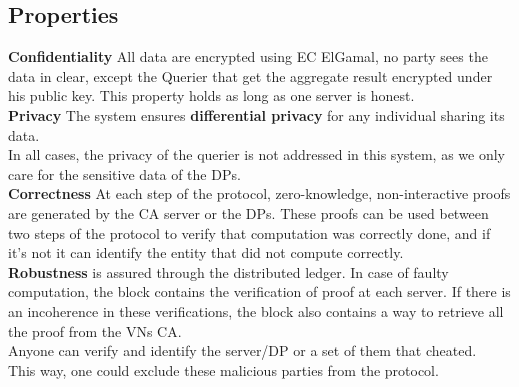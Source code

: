 \documentclass{article}
\begin{document}
\subsection{Properties}
\textbf{Confidentiality} All data are encrypted using EC ElGamal, no party sees the data in clear, except the Querier that get the aggregate result encrypted under his public key. This property holds as long as one server is honest.\\
\textbf{Privacy} The system ensures \textbf{differential privacy} for any individual sharing its data.\\
In all cases, the privacy of the querier is not addressed in this system, as we only care for the sensitive data of the DPs.\\
\textbf{Correctness} At each step of the protocol, zero-knowledge, non-interactive proofs are generated by the CA server or the DPs. These proofs can be used between two steps of the protocol to verify that computation was correctly done, and if it's not it can identify the entity that did not compute correctly.\\
\textbf{Robustness} is assured through the distributed ledger. In case of faulty computation, the block contains the verification of proof at each server.
If there is an incoherence in these verifications, the block also contains a way to retrieve all the proof from the VNs CA.\\
Anyone can verify and identify the server/DP or a set of them that cheated.\\
This way, one could exclude these malicious parties from the protocol.
\end{document}
